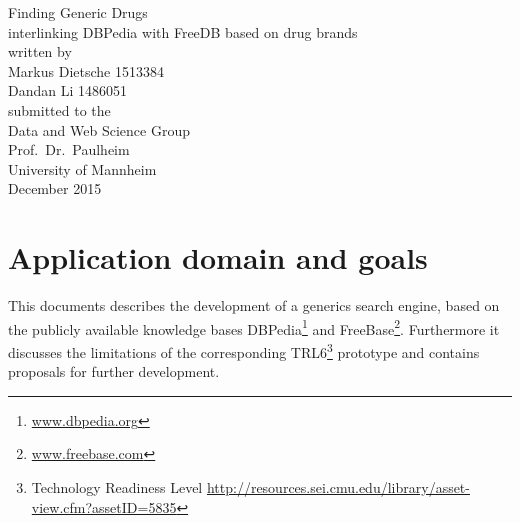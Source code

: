 \documentclass[11pt,titlepage,oneside,openany]{book}
\begin{document}
\begin{titlepage}
	\vspace*{2cm}
  \begin{center}
   {\Huge Finding Generic Drugs \\}
	\vspace*{0.5cm}
   {\large  interlinking DBPedia with FreeDB based on drug brands \\}
   \vspace{2cm} 
   \vspace{2cm}
   {written by\\
    Markus Dietsche 1513384 \\
    Dandan Li 1486051\\
   }
   \vspace{1cm} 
   {submitted to the\\
    Data and Web Science Group \\
    Prof.\ Dr.\ Paulheim\\
    University of Mannheim\\} \vspace{2cm}
   {December 2015}
  \end{center}
\end{titlepage} 

\tableofcontents
\newpage





\newpage





\chapter{Application domain and goals}
\label{cha:domain}
This documents describes the development of a generics search engine, based on the publicly available knowledge bases DBPedia\footnote{\url{www.dbpedia.org}} and FreeBase\footnote{\url{www.freebase.com}}. Furthermore it discusses the limitations of the corresponding TRL6\footnote{Technology Readiness Level \url{http://resources.sei.cmu.edu/library/asset-view.cfm?assetID=5835}} prototype and contains proposals for further development.
\end{document}

